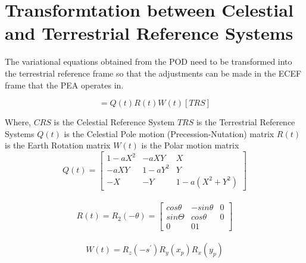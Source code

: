 \section{Transformtation between Celestial and Terrestrial Reference Systems}

The variational equations obtained from the POD need to be transformed into the terrestrial reference frame so that the adjustments can be made in the ECEF frame that the PEA operates in.

\begin{equation}
    [CRS] = Q(t)R(t)W(t)[TRS]
\end{equation}

Where,
$CRS$ is the Celestial Reference System
$TRS$ is the Terrestrial Reference Systems
$Q(t)$ is the Celestial Pole motion (Precession-Nutation) matrix
$R(t)$ is the Earth Rotation matrix
$W(t)$ is the Polar motion matrix
\\
\begin{equation}
Q(t) = 
\begin{bmatrix} 
1-aX^2  & -aXY     & X \\
 -aXY   & 1 - aY^2 & Y \\
 -X     & -Y       & 1-a(X^2+Y^2) 
\end{bmatrix}
\end{equation}
\\
\begin{equation}
R(t) = R_2(-\theta) = 
\begin{bmatrix}
cos \theta & -sin \theta & 0 \\
sin \Theta & cos \theta  & 0 \\
0 & 0 1
\end{bmatrix}
\end{equation}
\\
\begin{equation}
    W(t) = R_z (-s^') R_y(x_p) R_x(y_p)
\end{equation}



